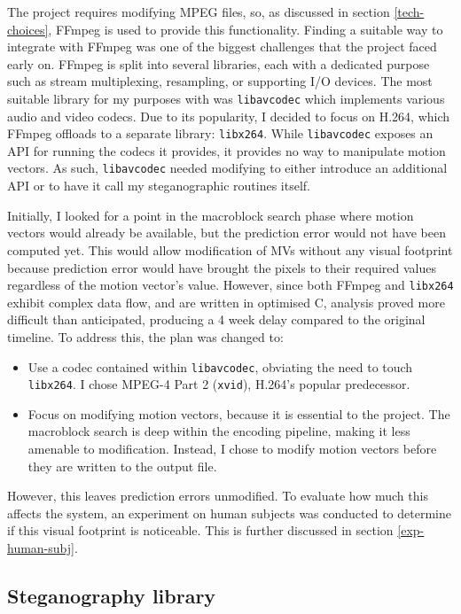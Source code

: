 \documentclass[12pt,british,twoside,notitlepage,usenames,dvipsnames,hypens,final]{report}
\numberwithin{equation}{section}
\numberwithin{figure}{section}
\begin{document}
The project requires modifying MPEG files, so, as discussed in section \ref{tech-choices}, FFmpeg is used to provide this functionality. Finding a suitable way to integrate with FFmpeg was one of the biggest challenges that the project faced early on. FFmpeg is split into several libraries, each with a dedicated purpose such as stream multiplexing, resampling, or supporting I/O devices. The most suitable library for my purposes with was \texttt{libavcodec} which implements various audio and video codecs. Due to its popularity, I decided to focus on H.264, which FFmpeg offloads to a separate library: \texttt{libx264}. While \texttt{libavcodec} exposes an API for running the codecs it provides, it provides no way to manipulate motion vectors. As such, \texttt{libavcodec} needed modifying to either introduce an additional API or to have it call my steganographic routines itself.

Initially, I looked for a point in the macroblock search phase where motion vectors would already be available, but the prediction error would not have been computed yet. This would allow modification of MVs without any visual footprint because prediction error would have brought the pixels to their required values regardless of the motion vector's value. However, since both FFmpeg and \texttt{libx264} exhibit complex data flow, and are written in optimised C, analysis proved more difficult than anticipated, producing a 4 week delay compared to the original timeline. To address this, the plan was changed to:
\begin{itemize}
\item Use a codec contained within \texttt{libavcodec}, obviating the need to touch \texttt{libx264}. I chose MPEG-4 Part 2 (\texttt{xvid}), H.264's popular predecessor.
\item Focus on modifying motion vectors, because it is essential to the project. The macroblock search is deep within the encoding pipeline, making it less amenable to modification. Instead, I chose to modify motion vectors before they are written to the output file.
\end{itemize}

However, this leaves prediction errors unmodified. To evaluate how much this affects the system, an experiment on human subjects was conducted to determine if this visual footprint is noticeable. This is further discussed in section \ref{exp-human-subj}.

\subsection{Steganography library}
\end{document}

